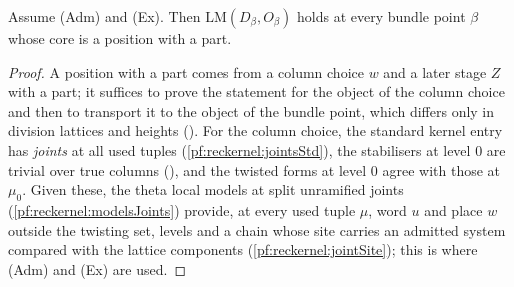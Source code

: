 \begin{theorem}\label{pf:reckernel:localModels}
Assume \textup{(Adm)} and \textup{(Ex)}. Then $\mathrm{LM}(D_\beta,O_\beta)$ holds at every bundle point $\beta$ whose core is a
position with a part.
\end{theorem}

\begin{proof}
A position with a part comes from a column choice $w$ and a later stage $Z$ with a part; it suffices to prove the
statement for the object of the column choice and then to transport it to the object of the bundle point, which
differs only in division lattices and heights
(). For the column choice, the standard
kernel entry has \emph{joints} at all used tuples (\cref{pf:reckernel:jointsStd}), the stabilisers at
level $0$ are trivial over true columns (), and
the twisted forms at level $0$ agree with those at $\mu_0$. Given these, the theta local models at split unramified
joints (\cref{pf:reckernel:modelsJoints}) provide, at every used tuple $\mu$, word
$u$ and place $w$ outside the twisting set, levels and a chain whose site carries an admitted system compared with the
lattice components (\cref{pf:reckernel:jointSite}); this is where
(Adm) and (Ex) are used.
\end{proof}

